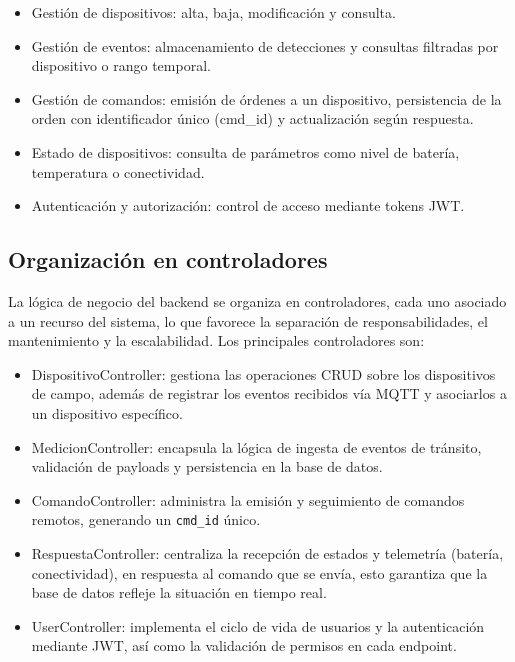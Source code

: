 \begin{itemize}
    \item Gestión de dispositivos: alta, baja, modificación y consulta.
    \item Gestión de eventos: almacenamiento de detecciones y consultas filtradas por dispositivo o rango temporal.
    \item Gestión de comandos: emisión de órdenes a un dispositivo, persistencia de la orden con identificador único (cmd\_id) y actualización según respuesta.
    \item Estado de dispositivos: consulta de parámetros como nivel de batería, temperatura o conectividad.
    \item Autenticación y autorización: control de acceso mediante tokens JWT.
\end{itemize}


\subsection{Organización en controladores}

La lógica de negocio del backend se organiza en controladores, cada uno asociado a un recurso del sistema, lo que favorece la separación de responsabilidades, el mantenimiento y la escalabilidad. Los principales controladores son:

\begin{itemize}
  \item DispositivoController: gestiona las operaciones CRUD sobre los dispositivos de campo, además de registrar los eventos recibidos vía MQTT y asociarlos a un dispositivo específico.
  \item MedicionController: encapsula la lógica de ingesta de eventos de tránsito, validación de payloads y persistencia en la base de datos.
  \item ComandoController: administra la emisión y seguimiento de comandos remotos, generando un \texttt{cmd\_id} único.
  
  \item RespuestaController: centraliza la recepción de estados y telemetría (batería, conectividad), en respuesta al comando que se envía, esto garantiza que la base de datos refleje la situación en tiempo real.
  \item UserController: implementa el ciclo de vida de usuarios y la autenticación mediante JWT\cite{jwtRFC7519}, así como la validación de permisos en cada endpoint.
\end{itemize}

